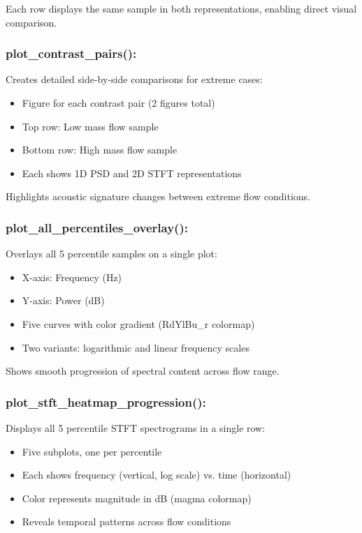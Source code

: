 Each row displays the same sample in both representations, enabling direct visual comparison.

\subsubsection{plot\_contrast\_pairs():}

Creates detailed side-by-side comparisons for extreme cases:
\begin{itemize}
    \item Figure for each contrast pair (2 figures total)
    \item Top row: Low mass flow sample
    \item Bottom row: High mass flow sample
    \item Each shows 1D PSD and 2D STFT representations
\end{itemize}

Highlights acoustic signature changes between extreme flow conditions.

\subsubsection{plot\_all\_percentiles\_overlay():}

Overlays all 5 percentile samples on a single plot:
\begin{itemize}
    \item X-axis: Frequency (Hz)
    \item Y-axis: Power (dB)
    \item Five curves with color gradient (RdYlBu\_r colormap)
    \item Two variants: logarithmic and linear frequency scales
\end{itemize}

Shows smooth progression of spectral content across flow range.

\subsubsection{plot\_stft\_heatmap\_progression():}

Displays all 5 percentile STFT spectrograms in a single row:
\begin{itemize}
    \item Five subplots, one per percentile
    \item Each shows frequency (vertical, log scale) vs. time (horizontal)
    \item Color represents magnitude in dB (magma colormap)
    \item Reveals temporal patterns across flow conditions
\end{itemize}


